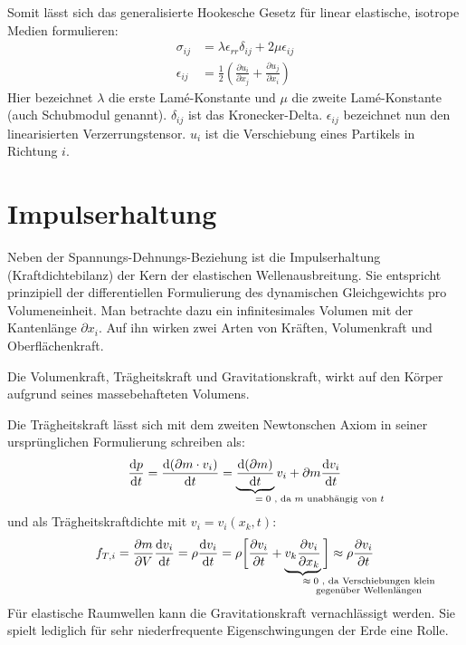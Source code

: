 \documentclass[pdftex,a4paper,parskip,listof=totoc,bibliography=totoc,onehalfspacing,12pt]{scrreprt}
\begin{document}
Somit lässt sich das generalisierte Hookesche Gesetz für linear elastische, isotrope Medien formulieren:
\begin{align}
	\sigma_{ij} &= \lambda \epsilon_{rr} \delta_{ij} + 2 \mu \epsilon_{ij}\label{eqn:GenHook}\\
	\epsilon_{ij} &= \frac{1}{2} \left( \frac{\partial u_i}{\partial x_j} + \frac{\partial u_j}{\partial x_i} \right)\label{eqn:Dehnij}
\end{align}
Hier bezeichnet $\lambda$ die erste Lamé-Konstante und $\mu$ die zweite Lamé-Konstante (auch Schubmodul genannt). $\delta_{ij}$ ist das Kronecker-Delta. $\epsilon_{ij}$ bezeichnet nun den linearisierten Verzerrungstensor. $u_i$ ist die Verschiebung eines Partikels in Richtung $i$.

\section{Impulserhaltung}
Neben der Spannungs-Dehnungs-Beziehung ist die Impulserhaltung (Kraftdichtebilanz) der Kern der elastischen Wellenausbreitung. Sie entspricht prinzipiell der differentiellen Formulierung des dynamischen Gleichgewichts pro Volumeneinheit. Man betrachte dazu ein infinitesimales Volumen mit der Kantenlänge $\partial x_i$. Auf ihn wirken zwei Arten von Kräften, Volumenkraft und Oberflächenkraft. \citep{landau:97}

Die Volumenkraft, Trägheitskraft und Gravitationskraft, wirkt auf den Körper aufgrund seines massebehafteten Volumens.

Die Trägheitskraft lässt sich mit dem zweiten Newtonschen Axiom in seiner ursprünglichen Formulierung schreiben als:
\begin{equation}
	\frac{\mathrm{d} p}{\mathrm{d} t} = \frac{\mathrm{d} (\partial m \cdot v_i)}{\mathrm{d} t} = \underbrace{\frac{\mathrm{d} (\partial m)}{\mathrm{d} t}}_{\mathrlap{\text{$= 0$ , da $m$ unabhängig von $t$}}} v_i + \partial m \frac{\mathrm{d} v_i}{\mathrm{d} t}
\end{equation}
und als Trägheitskraftdichte mit $v_i = v_i (x_k,t)$:
\begin{equation}
	f_{T,i} = \frac{\partial m}{\partial V} \frac{\mathrm{d} v_i}{\mathrm{d} t} = \rho \frac{\mathrm{d} v_i}{\mathrm{d} t} = \rho \bigg[ \frac{\partial v_i}{\partial t} + \underbrace{v_k \frac{\partial v_i}{\partial x_k}}_{\mathrlap{\substack{\text{$\approx 0$ , da Verschiebungen klein}\\\text{gegenüber Wellenlängen}}}} \bigg] \approx \rho \frac{\partial v_i}{\partial t}\label{eqn:TKD}
\end{equation}
Für elastische Raumwellen kann die Gravitationskraft vernachlässigt werden. Sie spielt lediglich für sehr niederfrequente Eigenschwingungen der Erde eine Rolle.
\end{document}
